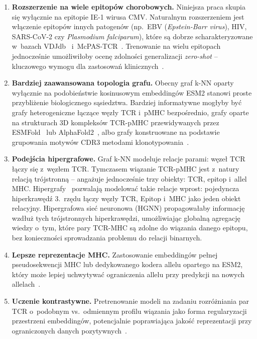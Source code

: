 \documentclass{SGGW-thesis}
\begin{document}
\begin{enumerate}
  \item \textbf{Rozszerzenie na wiele epitopów chorobowych.} Niniejsza praca skupia się
        wyłącznie na epitopie IE-1 wirusa CMV. Naturalnym rozszerzeniem jest włączenie
        epitopów innych patogenów (np.\ EBV (\textit{Epstein-Barr virus}), HIV, SARS-CoV-2
        czy \textit{Plasmodium falciparum}), które są dobrze scharakteryzowane
        w~bazach VDJdb~\cite{bagaev2020} i~McPAS-TCR~\cite{tickotsky2017}. Trenowanie na
        wielu epitopach jednocześnie umożliwiłoby ocenę zdolności generalizacji \textit{zero-shot} --
        kluczowego wymogu dla zastosowań klinicznych~\cite{moris2021}.

  \item \textbf{Bardziej zaawansowana topologia grafu.} Obecny graf k-NN oparty wyłącznie
        na podobieństwie kosinusowym embeddingów ESM2 stanowi proste przybliżenie biologicznego
        sąsiedztwa. Bardziej informatywne mogłyby być grafy heterogeniczne łączące węzły TCR
        i~pMHC bezpośrednio, grafy oparte na strukturach 3D kompleksów TCR-pMHC przewidywanych
        przez ESMFold~\cite{lin2023} lub AlphaFold2~\cite{jumper2021}, albo grafy konstruowane
        na podstawie grupowania motywów CDR3 metodami klonotypowania~\cite{glanville2017}.

  \item \textbf{Podejścia hipergrafowe.} Graf k-NN modeluje relacje parami: węzeł TCR łączy
        się z~węzłem TCR. Tymczasem wiązanie TCR-pMHC jest z~natury relacją trójstronną --
        angażuje jednocześnie trzy obiekty: TCR, epitop i~allel MHC. Hipergrafy~\cite{feng2019}
        pozwalają modelować takie relacje wprost: pojedyncza hiperkrawędź 3.~rzędu łączy węzły
        TCR, Epitop i~MHC jako jeden obiekt relacyjny. Hipergrafowa sieć neuronowa (HGNN)
        propagowałaby informację wzdłuż tych trójstronnych hiperkrawędzi, umożliwiając globalną
        agregację wiedzy o~tym, które pary TCR-MHC są zdolne do wiązania danego epitopu, bez
        konieczności sprowadzania problemu do relacji binarnych.

  \item \textbf{Lepsze reprezentacje MHC.} Zastosowanie embeddingów pełnej pseudosekwencji MHC
        lub dedykowanego kodera allelu opartego na ESM2, który może lepiej uchwytywać
        ograniczenia allelu przy predykcji na nowych allelach~\cite{montemurro2022}.

  \item \textbf{Uczenie kontrastywne.} Pretrenowanie modeli na zadaniu rozróżniania par TCR
        o~podobnym vs.\ odmiennym profilu wiązania jako forma regularyzacji przestrzeni
        embeddingów, potencjalnie poprawiająca jakość reprezentacji przy ograniczonych
        danych pozytywnych~\cite{glanville2017}.
\end{enumerate}
\end{document}

